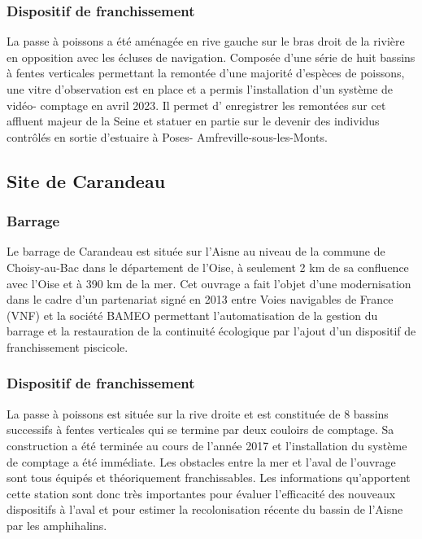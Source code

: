 \documentclass[11pt,titlepage,twoside]{article}\usepackage[]{graphicx}\usepackage[table]{xcolor}
\begin{document}
\subsubsection{Dispositif de franchissement}

La passe à poissons a été aménagée en rive gauche sur le bras droit de la rivière en opposition avec les écluses
de navigation. Composée d’une série de huit bassins à fentes verticales permettant la remontée d’une majorité
d’espèces de poissons, une vitre d’observation est en place et a permis l'installation d'un système de vidéo-
comptage en avril 2023. Il permet d' enregistrer les remontées sur cet affluent majeur de la Seine et statuer en partie sur le
devenir des individus contrôlés en sortie d’estuaire à Poses- Amfreville-sous-les-Monts.

\subsection{Site de Carandeau}

\subsubsection{Barrage}

Le barrage de Carandeau est située sur l'Aisne au niveau de la commune de Choisy-au-Bac dans le département de l’Oise, à seulement 2 km de sa confluence avec l’Oise et à 390 km de la mer. Cet ouvrage a fait l'objet d'une modernisation dans le cadre d'un partenariat signé en 2013 entre Voies navigables de France (VNF) et la société BAMEO permettant l'automatisation de la gestion du barrage et la restauration de la continuité écologique par l'ajout d'un dispositif de franchissement piscicole.

\subsubsection{Dispositif de franchissement}

La passe à poissons est située sur la rive droite et est constituée de 8 bassins successifs à fentes verticales qui se termine par deux couloirs de comptage. Sa construction a été terminée au cours de l'année 2017 et l'installation du système de comptage a été immédiate. Les obstacles entre la mer et l’aval de l’ouvrage sont tous équipés et théoriquement franchissables. Les informations qu’apportent cette station sont donc très importantes pour évaluer l’efficacité des nouveaux dispositifs à l’aval et pour estimer la recolonisation récente du bassin de l’Aisne par les amphihalins.
\end{document}
